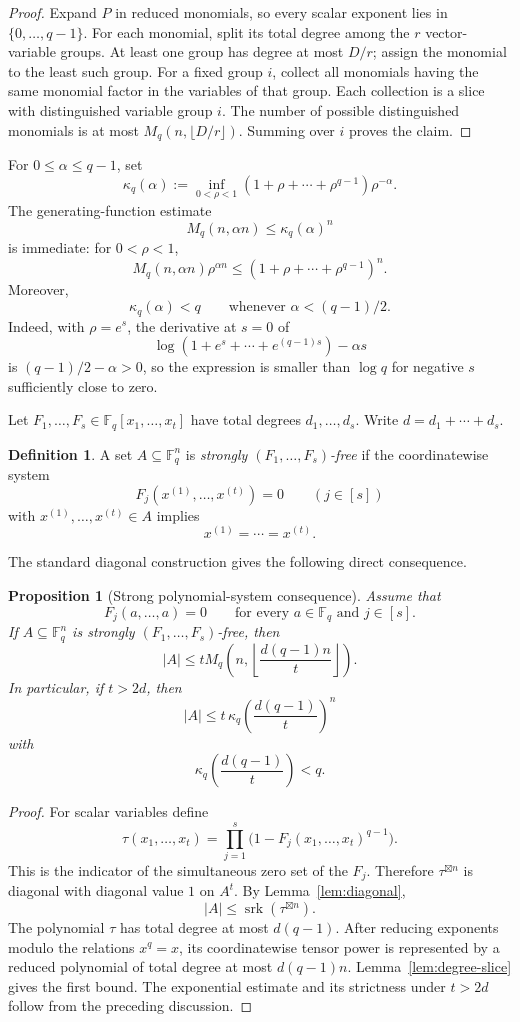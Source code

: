 \documentclass[10pt,a4paper]{amsart}
\newtheorem{proposition}[theorem]{Proposition}
\theoremstyle{definition}
\newtheorem{definition}[theorem]{Definition}
\newcommand{\F}{\mathbb F}
\newcommand{\srk}{\operatorname{srk}}
\newcommand{\boxt}{\boxtimes}
\newcommand{\1}{\mathbf 1}
\begin{document}
\begin{proof}
Expand $P$ in reduced monomials, so every scalar exponent lies in $\{0,\ldots,q-1\}$.  For each monomial, split its total degree among the $r$ vector-variable groups.  At least one group has degree at most $D/r$; assign the monomial to the least such group.  For a fixed group $i$, collect all monomials having the same monomial factor in the variables of that group.  Each collection is a slice with distinguished variable group $i$.  The number of possible distinguished monomials is at most $M_q(n,\lfloor D/r\rfloor)$.  Summing over $i$ proves the claim.
\end{proof}

For $0\le\alpha\le q-1$, set
\[
 \kappa_q(\alpha)
 :=\inf_{0<\rho<1}
 (1+\rho+\cdots+\rho^{q-1})\rho^{-\alpha}.
\]
The generating-function estimate
\[
 M_q(n,\alpha n)\le\kappa_q(\alpha)^n
\]
is immediate: for $0<\rho<1$,
\[
 M_q(n,\alpha n)\rho^{\alpha n}
 \le(1+\rho+\cdots+\rho^{q-1})^n.
\]
Moreover,
\[
 \kappa_q(\alpha)<q\qquad\text{whenever }\alpha<(q-1)/2.
\]
Indeed, with $\rho=e^s$, the derivative at $s=0$ of
\[
 \log(1+e^s+\cdots+e^{(q-1)s})-\alpha s
\]
is $(q-1)/2-\alpha>0$, so the expression is smaller than $\log q$ for negative $s$ sufficiently close to zero.

Let $F_1,\ldots,F_s\in\F_q[x_1,\ldots,x_t]$ have total degrees $d_1,\ldots,d_s$.  Write $d=d_1+\cdots+d_s$.

\begin{definition}
A set $A\subseteq\F_q^n$ is \emph{strongly $(F_1,\ldots,F_s)$-free} if the coordinatewise system
\[
 F_j(x^{(1)},\ldots,x^{(t)})=0\qquad(j\in[s])
\]
with $x^{(1)},\ldots,x^{(t)}\in A$ implies
\[
 x^{(1)}=\cdots=x^{(t)}.
\]
\end{definition}

The standard diagonal construction gives the following direct consequence.

\begin{proposition}[Strong polynomial-system consequence]\label{thm:strong-system}
Assume that
\[
 F_j(a,\ldots,a)=0
\qquad\text{for every }a\in\F_q\text{ and }j\in[s].
\]
If $A\subseteq\F_q^n$ is strongly $(F_1,\ldots,F_s)$-free, then
\[
 |A|\le
 tM_q\left(n,\left\lfloor\frac{d(q-1)n}{t}\right\rfloor\right).
\]
In particular, if $t>2d$, then
\[
 |A|\le t\,\kappa_q\left(\frac{d(q-1)}t\right)^n
\]
with
\[
 \kappa_q\left(\frac{d(q-1)}t\right)<q.
\]
\end{proposition}

\begin{proof}
For scalar variables define
\[
 \tau(x_1,\ldots,x_t)=
 \prod_{j=1}^s\bigl(1-F_j(x_1,\ldots,x_t)^{q-1}\bigr).
\]
This is the indicator of the simultaneous zero set of the $F_j$.  Therefore $\tau^{\boxt n}$ is diagonal with diagonal value $1$ on $A^t$.  By Lemma~\ref{lem:diagonal},
\[
 |A|\le\srk(\tau^{\boxt n}).
\]
The polynomial $\tau$ has total degree at most $d(q-1)$.  After reducing exponents modulo the relations $x^q=x$, its coordinatewise tensor power is represented by a reduced polynomial of total degree at most $d(q-1)n$.  Lemma~\ref{lem:degree-slice} gives the first bound.  The exponential estimate and its strictness under $t>2d$ follow from the preceding discussion.
\end{proof}
\end{document}
